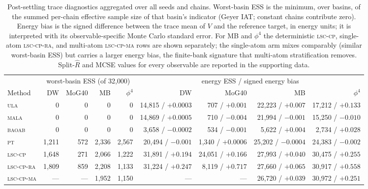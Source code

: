 \documentclass[11pt]{article}
\newcommand{\Rhat}{\widehat R}
\begin{document}
\begin{table}[!ht]
\centering
\footnotesize
\setlength{\tabcolsep}{2.5pt}
\begin{tabular}{lrrrr|rrrr}
\toprule
 & \multicolumn{4}{c|}{worst-basin ESS (of 32{,}000)} &
   \multicolumn{4}{c}{energy ESS / signed energy bias}\\
Method & DW & MoG40 & MB & $\phi^4$ & DW & MoG40 & MB & $\phi^4$\\
\midrule
\textsc{ula}   & 0 & 0 & 0 & 0 & 14{,}815 / $+0.0003$ & 707 / $+0.001$ & 22{,}223 / $+0.007$ & 17{,}212 / $+0.133$\\
\textsc{mala}  & 0 & 0 & 0 & 0 & 14{,}869 / $+0.0005$ & 710 / $-0.004$ & 21{,}994 / $-0.001$ & 15{,}250 / $-0.010$\\
\textsc{baoab} & 0 & 0 & 0 & 0 & 3{,}658 / $-0.0002$ & 534 / $-0.001$ & 5{,}622 / $+0.004$ & 2{,}734 / $+0.028$\\
\textsc{pt}    & 1{,}211 & 572 & 2{,}336 & 2{,}567 & 20{,}494 / $-0.001$ & 1{,}340 / $+0.0006$ & 25{,}202 / $-0.0004$ & 24{,}383 / $-0.002$\\
\textsc{lsc-cp} & 1{,}648 & 271 & 2{,}066 & 1{,}222 & 31{,}891 / $+0.194$ & 24{,}051 / $+0.166$ & 27{,}993 / $+0.040$ & 30{,}475 / $+0.255$\\
\textsc{lsc-cp-ra} & 1{,}809 & 859 & 2{,}208 & 1{,}133 & 31{,}224 / $+0.247$ & 8{,}119 / $+0.717$ & 27{,}660 / $+0.065$ & 30{,}917 / $+0.558$\\
\textsc{lsc-cp-ma} & --- & --- & 1{,}952 & 1{,}150 & --- & --- & 26{,}720 / $+0.039$ & 30{,}972 / $+0.251$\\
\bottomrule
\end{tabular}
\caption{Post-settling trace diagnostics aggregated over all seeds and chains.
Worst-basin ESS is the minimum, over basins, of the summed per-chain effective
sample size of that basin's indicator (Geyer IAT; constant chains contribute
zero).  Energy bias is the signed difference between the trace mean of $V$ and
the reference target, in energy units; it is interpreted with its
observable-specific Monte Carlo standard error.  For MB and $\phi^4$ the
deterministic \textsc{lsc-cp}, single-atom \textsc{lsc-cp-ra}, and multi-atom
\textsc{lsc-cp-ma} rows are shown separately; the single-atom arm mixes
comparably (similar worst-basin ESS) but carries a larger energy bias, the
finite-bank signature that multi-atom stratification removes.
Split-$\Rhat$ and MCSE values for every observable are reported in the
supporting data.}
\label{tab:ess}
\end{table}
\end{document}
